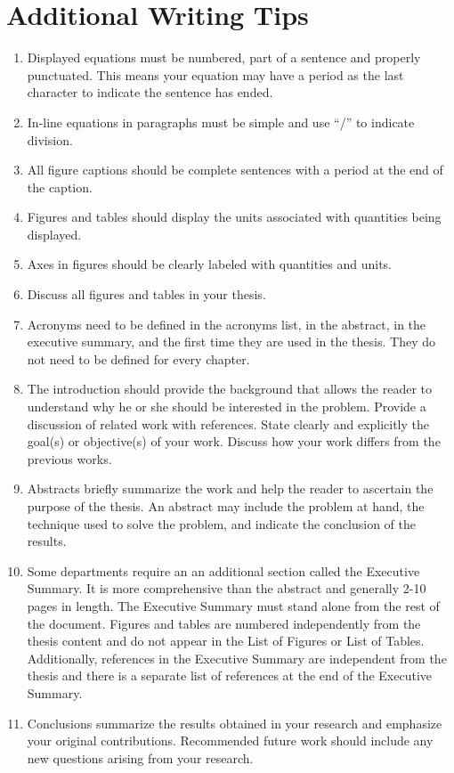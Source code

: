 \section{Additional Writing Tips}
\begin{enumerate}
\item Displayed equations must be numbered, part of a sentence and properly punctuated.  This means
  your equation may have a period as the last character to indicate the sentence has ended. 
\item In-line equations in paragraphs must be simple and use ``/'' to indicate division.
\item All figure captions should be complete sentences with a period at the end of the caption.
\item Figures and tables should display the units associated with quantities being displayed.
\item Axes in figures should be clearly labeled with quantities and units.
\item Discuss all figures and tables in your thesis.
\item Acronyms need to be defined in the acronyms list, in the abstract, in the executive
  summary, and the first time they are used in the thesis.  They do not need to be
  defined for every chapter.
\item The introduction should provide the background that allows the reader to
  understand why he or she should be interested in the problem.  Provide a
  discussion of related work with references.  State clearly and explicitly the
  goal(s) or objective(s) of your work.  Discuss how your work differs from the
  previous works.
\item Abstracts briefly summarize the work and help the reader to ascertain the purpose
  of the thesis.  An abstract may include the problem at hand, the technique used to solve
  the problem, and indicate the conclusion of the results.
\item Some departments require an an additional section called the Executive Summary.
  It is more comprehensive than the abstract and generally 2-10 pages in length.  The
  Executive Summary must stand alone from the rest of the document.  Figures and tables
  are numbered independently from the thesis content and do not appear in the List of
  Figures or List of Tables.  Additionally, references in the Executive Summary are
  independent from the thesis and there is a separate list of references at the
  end of the Executive Summary.   
\item Conclusions summarize the results obtained in your research and emphasize
  your original contributions.  Recommended future work should include any new
  questions arising from your research.
\end{enumerate}

